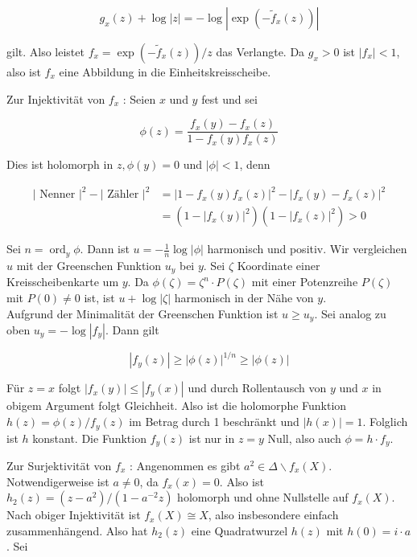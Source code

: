 \documentclass[10pt, letterpaper]{article}
\begin{document}
$$
g_{x}(z)+\log |z|=-\log \left|\exp \left(-\widetilde{f}_{x}(z)\right)\right|
$$

gilt. Also leistet $f_{x}=\exp \left(-\widetilde{f}_{x}(z)\right) / z$ das Verlangte. Da $g_{x}>0$ ist $\left|f_{x}\right|<1$, also ist $f_{x}$ eine Abbildung in die Einheitskreisscheibe.

Zur Injektivität von $f_{x}$ : Seien $x$ und $y$ fest und sei

$$
\phi(z)=\frac{f_{x}(y)-f_{x}(z)}{1-f_{x}(y) f_{x}(z)}
$$

Dies ist holomorph in $z, \phi(y)=0$ und $|\phi|<1$, denn

$$
\begin{aligned}
\mid \text { Nenner }\left.\right|^{2}-\mid \text { Zähler }\left.\right|^{2} & =\left|1-f_{x}(y) f_{x}(z)\right|^{2}-\left|f_{x}(y)-f_{x}(z)\right|^{2} \\
& =\left(1-\left|f_{x}(y)\right|^{2}\right)\left(1-\left|f_{x}(z)\right|^{2}\right)>0
\end{aligned}
$$

Sei $n=\operatorname{ord}_{y} \phi$. Dann ist $u=-\frac{1}{n} \log |\phi|$ harmonisch und positiv. Wir vergleichen $u$ mit der Greenschen Funktion $u_{y}$ bei $y$. Sei $\zeta$ Koordinate einer Kreisscheibenkarte um $y$. Da $\phi(\zeta)=\zeta^{n} \cdot P(\zeta)$ mit einer Potenzreihe $P(\zeta)$ mit $P(0) \neq 0$ ist, ist $u+\log |\zeta|$ harmonisch in der Nähe von $y$.\\
Aufgrund der Minimalität der Greenschen Funktion ist $u \geqslant u_{y}$. Sei analog zu oben $u_{y}=-\log \left|f_{y}\right|$. Dann gilt

$$
\left|f_{y}(z)\right| \geqslant|\phi(z)|^{1 / n} \geqslant|\phi(z)|
$$

Für $z=x$ folgt $\left|f_{x}(y)\right| \leqslant\left|f_{y}(x)\right|$ und durch Rollentausch von $y$ und $x$ in obigem Argument folgt Gleichheit. Also ist die holomorphe Funktion $h(z)=\phi(z) / f_{y}(z)$ im Betrag durch 1 beschränkt und $|h(x)|=1$. Folglich ist $h$ konstant. Die Funktion $f_{y}(z)$ ist nur in $z=y$ Null, also auch $\phi=h \cdot f_{y}$.

Zur Surjektivität von $f_{x}$ : Angenommen es gibt $a^{2} \in \Delta \backslash f_{x}(X)$. Notwendigerweise ist $a \neq 0$, da $f_{x}(x)=0$. Also ist $h_{2}(z)=\left(z-a^{2}\right) /\left(1-a^{-2} z\right)$ holomorph und ohne Nullstelle auf $f_{x}(X)$. Nach obiger Injektivität ist $f_{x}(X) \cong X$, also insbesondere einfach zusammenhängend. Also hat $h_{2}(z)$ eine Quadratwurzel $h(z)$ mit $h(0)=i \cdot a$. Sei
\end{document}
